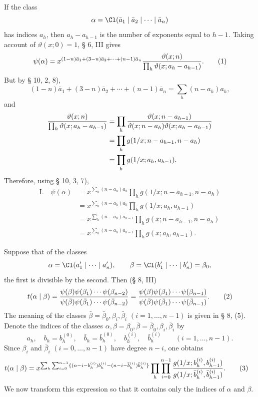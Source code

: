 If the class
\[
 \alpha=\Cl(\bar a_1\mid\bar a_2\mid\cdots\mid\bar a_n)
\]
has indices $a_h$, then $a_h-a_{h-1}$ is the number of exponents equal to $h-1$. Taking account of $\vartheta(x;0)=1$, § 6, III gives
\begin{equation}
 \psi(\alpha)=x^{(1-n)\bar a_1+(3-n)\bar a_2+\cdots+(n-1)\bar a_n}
 {\vartheta(x;n)\over\prod_h\vartheta(x;a_h-a_{h-1})}.
\tag{1}
\end{equation}
But by § 10, 2, 8),
\[
 (1-n)\bar a_1+(3-n)\bar a_2+\cdots+(n-1)\bar a_n=\sum_h(n-a_h)a_h,
\]
and
\begin{align*}
 {\vartheta(x;n)\over\prod_h\vartheta(x;a_h-a_{h-1})}
 &=\prod_h {\vartheta(x;n-a_{h-1})\over\vartheta(x;n-a_h)\vartheta(x;a_h-a_{h-1})}\\
 &=\prod_h g(1/x;n-a_{h-1},n-a_h)\\
 &=\prod_h g(1/x;a_h,a_{h-1}).
\end{align*}
Therefore, using § 10, 3, 7),
\begin{align*}
\text{I.}\quad
\psi(\alpha)&=x^{\sum_h(n-a_h)a_h}\prod_h g(1/x;n-a_{h-1},n-a_h)\\
&=x^{\sum_h(n-a_h)a_h}\prod_h g(1/x;a_h,a_{h-1})\\
&=x^{\sum_h(n-a_h)a_{h-1}}\prod_h g(x;n-a_{h-1},n-a_h)\\
&=x^{\sum_h(n-a_h)a_{h-1}}\prod_h g(x;a_h,a_{h-1}).
\end{align*}

Suppose that of the classes
\[
 \alpha=\Cl(a'_1\mid\cdots\mid a'_n),\qquad
 \beta=\Cl(b'_1\mid\cdots\mid b'_n)=\beta_0,
\]
the first is divisible by the second. Then (§ 8, III)
\begin{equation}
 t(\alpha\mid\beta)=
 {\psi(\beta)\psi(\beta_1)\cdots\psi(\beta_{n-2})
  \over
  \psi(\bar\beta)\psi(\bar\beta_1)\cdots\psi(\bar\beta_{n-2})}
 = {\psi(\beta)\psi(\beta_1)\cdots\psi(\beta_{n-1})
  \over
  \psi(\bar\beta)\psi(\bar\beta_1)\cdots\psi(\bar\beta_{n-1})}.
\tag{2}
\end{equation}
The meaning of the classes $\bar\beta=\bar\beta_0,\beta_i,\bar\beta_i$ $(i=1,
\ldots,n-1)$ is given in § 8, (5). Denote the indices of the classes $\alpha,\beta=\beta_0,\bar\beta=\bar\beta_0,\beta_i,\bar\beta_i$ by
\[
 a_h,
 \quad b_h=b_h^{(0)},\quad \bar b_h=\bar b_h^{(0)},
 \quad b_h^{(i)},\quad \bar b_h^{(i)}\qquad(i=1,\ldots,n-1).
\]
Since $\beta_i$ and $\bar\beta_i$ $(i=0,
\ldots,n-1)$ have degree $n-i$, one obtains
\begin{align}
 t(\alpha\mid\beta)
&=x^{\sum_h\sum_{i=0}^{n-1}\{(n-i-b_h^{(i)})b_h^{(i)}-(n-i-\bar b_h^{(i)})\bar b_h^{(i)}\}}
 \prod_h\prod_{i=0}^{n-1}
 {g(1/x;b_h^{(i)},b_{h-1}^{(i)})\over
 g(1/x;\bar b_h^{(i)},\bar b_{h-1}^{(i)})}.
\tag{3}
\end{align}
We now transform this expression so that it contains only the indices of $\alpha$ and $\beta$.

